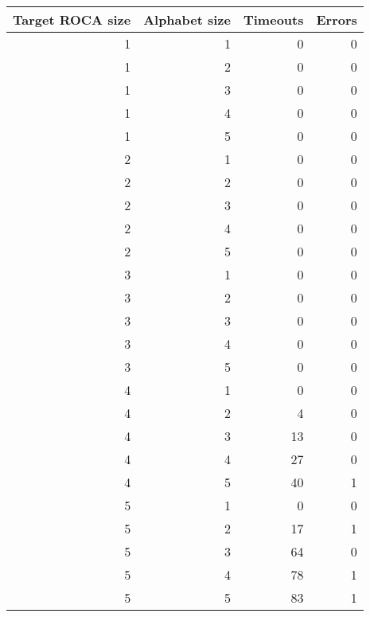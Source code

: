 \begin{tabular}{rrrr}
\toprule
 Target ROCA size &  Alphabet size &  Timeouts &  Errors \\
\midrule
                1 &              1 &         0 &       0 \\
                1 &              2 &         0 &       0 \\
                1 &              3 &         0 &       0 \\
                1 &              4 &         0 &       0 \\
                1 &              5 &         0 &       0 \\
                2 &              1 &         0 &       0 \\
                2 &              2 &         0 &       0 \\
                2 &              3 &         0 &       0 \\
                2 &              4 &         0 &       0 \\
                2 &              5 &         0 &       0 \\
                3 &              1 &         0 &       0 \\
                3 &              2 &         0 &       0 \\
                3 &              3 &         0 &       0 \\
                3 &              4 &         0 &       0 \\
                3 &              5 &         0 &       0 \\
                4 &              1 &         0 &       0 \\
                4 &              2 &         4 &       0 \\
                4 &              3 &        13 &       0 \\
                4 &              4 &        27 &       0 \\
                4 &              5 &        40 &       1 \\
                5 &              1 &         0 &       0 \\
                5 &              2 &        17 &       1 \\
                5 &              3 &        64 &       0 \\
                5 &              4 &        78 &       1 \\
                5 &              5 &        83 &       1 \\
\bottomrule
\end{tabular}
